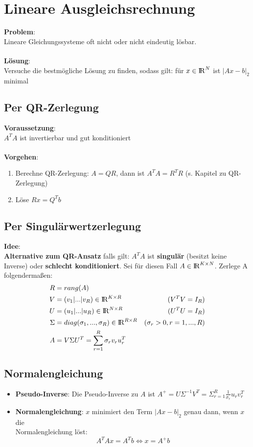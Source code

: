 \documentclass[10pt,a4paper]{article}
\def\realnumbers{{\rm I\!R}}
\begin{document}
	\section{Lineare Ausgleichsrechnung}
	\textbf{Problem}:\\Lineare Gleichungssysteme oft nicht oder nicht eindeutig lösbar.\\\\
	\textbf{Lösung}:\\Versuche die bestmögliche Lösung zu finden, sodass gilt: für $x \in \realnumbers^N$ ist $|Ax - b|_2$ minimal

	\subsection{Per QR-Zerlegung}
	\textbf{Voraussetzung}:\\$A^TA$ ist invertierbar und gut konditioniert\\\\
	\textbf{Vorgehen}:
	\begin{enumerate}
		\item Berechne QR-Zerlegung: $A = QR$, dann ist $A^TA = R^TR$ (s. Kapitel zu QR-Zerlegung)
		\item Löse $Rx = Q^Tb$
	\end{enumerate}
	
	\subsection{Per Singulärwertzerlegung}
	\textbf{Idee}:\\\textbf{Alternative zum QR-Ansatz} falls gilt: $A^TA$ ist \textbf{singulär} (besitzt keine Inverse) oder \textbf{schlecht konditioniert}. Sei für diesen Fall $A \in \realnumbers^{K\times N}$. Zerlege A folgendermaßen:
	\begin{align*}
		R &= rang(A)\\
		V &= (v_1 | ... | v_R) \in \realnumbers^{K \times R}& (V^TV = I_R)\\
		U &= (u_1 | ... | u_R) \in \realnumbers^{N \times R}& (U^TU = I_R)\\
		\Sigma &= diag(\sigma_1, ..., \sigma_R) \in \realnumbers^{R\times R}& (\sigma_r > 0, r = 1,...,R)\\
		A &= V\Sigma U^T = \sum^R_{r=1}\sigma_rv_ru_r^T &
	\end{align*}

	\subsection{Normalengleichung}
	\begin{itemize}
		\item \textbf{Pseudo-Inverse}: Die Pseudo-Inverse zu $A$ ist $A^+ = U\Sigma^{-1}V^T = \Sigma^R_{r = 1}\frac{1}{\sigma_r}u_rv_r^T$
		\item \textbf{Normalengleichung}: $x$ minimiert den Term $|Ax - b|_2$ genau dann, wenn $x$ die\\Normalengleichung löst: $$A^TAx = A^Tb \Leftrightarrow x = A^+b$$
	\end{itemize}	
	
\end{document}
